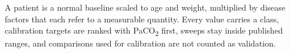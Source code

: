 \begin{summarybox}
A patient is a normal baseline scaled to age and weight, multiplied by disease factors that each refer to a measurable quantity. Every value carries a class, calibration targets are ranked with PaCO\textsubscript{2} first, sweeps stay inside published ranges, and comparisons used for calibration are not counted as validation.
\end{summarybox}
